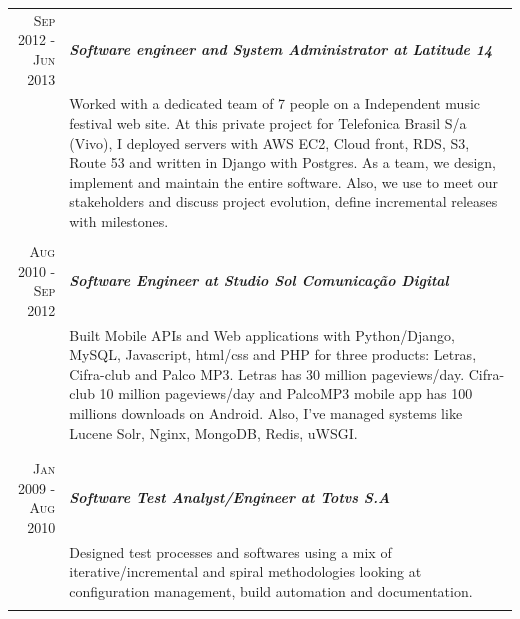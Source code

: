 \documentclass[a4paper,10pt]{article} %
\begin{document}
\begin{longtable}{r|p{11cm}}

\textsc{Sep 2012 - Jun 2013} & \emph{\bf Software engineer and System
Administrator at Latitude 14} \\
& \footnotesize{Worked with a dedicated team of 7 people on a Independent
	music festival web site. At this private project for Telefonica Brasil
	S/a (Vivo), I deployed servers with AWS EC2, Cloud front, RDS, S3,
	Route 53 and written in Django with Postgres. As a team, we design,
	implement and maintain the entire software. Also, we use to meet our
	stakeholders and discuss project evolution, define incremental releases
	with milestones.} \\

\multicolumn{2}{c}{} \\



\textsc{Aug 2010 - Sep 2012} & \emph{\bf Software Engineer at Studio Sol
Comunicação Digital}  \\
& \footnotesize{Built Mobile APIs and Web applications with Python/Django,
	MySQL, Javascript, html/css and PHP for three products: Letras, Cifra-club
	and Palco MP3. Letras has 30 million pageviews/day. Cifra-club 10 million
	pageviews/day and PalcoMP3 mobile app has 100 millions downloads on
	Android. Also, I've managed systems like Lucene Solr, Nginx, MongoDB,
	Redis, uWSGI.} \\
\multicolumn{2}{c}{} \\

\\
\textsc{Jan 2009 - Aug 2010} & \emph{\bf Software Test Analyst/Engineer
at Totvs S.A} \\
& \footnotesize{Designed test processes and softwares using a mix
of iterative/incremental and spiral methodologies looking at
configuration management, build automation and documentation.} \\
\multicolumn{2}{c}{} \\

\end{longtable}


\end{document}

